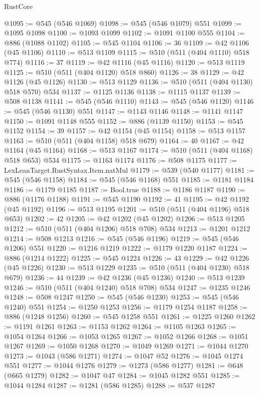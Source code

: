\begin{lexlean}{RustCore}
\begin{coremodule}
@1095 := @545 (@546 @1069)
@1098 := @545 (@546 @1079) @551
@1099 := @1095 @1098
@1100 := @1093 @1099
@1102 := @1091 @1100 @555
@1104 := @886 (@1088 @1102)
@1105 := @545 @1104
@1106 := 36
@1109 := @42 @1106 (@45 @1106)
@1110 := @513 @1109
@1115 := @510 (@511 (@404 @1110) @518 @774)
@1116 := 37
@1119 := @42 @1116 (@45 @1116)
@1120 := @513 @1119
@1125 := @510 (@511 (@404 @1120) @518 @860)
@1126 := 38
@1129 := @42 @1126 (@45 @1126)
@1130 := @513 @1129
@1136 := @510 (@511 (@404 @1130) @518 @570) @534
@1137 := @1125 @1136
@1138 := @1115 @1137
@1139 := @508 @1138
@1141 := @545 (@546 @1110)
@1143 := @545 (@546 @1120)
@1146 := @545 (@546 @1130) @551
@1147 := @1143 @1146
@1148 := @1141 @1147
@1150 := @1091 @1148 @555
@1152 := @886 (@1139 @1150)
@1153 := @545 @1152
@1154 := 39
@1157 := @42 @1154 (@45 @1154)
@1158 := @513 @1157
@1163 := @510 (@511 (@404 @1158) @518 @679)
@1164 := 40
@1167 := @42 @1164 (@45 @1164)
@1168 := @513 @1167
@1174 := @510 (@511 (@404 @1168) @518 @653) @534
@1175 := @1163 @1174
@1176 := @508 @1175
@1177 := LexLeanTarget.RustSyntax.Item.natMul
@1179 := @539 (@540 @1177)
@1181 := @545 (@546 @1158)
@1184 := @545 (@546 @1168) @551
@1185 := @1181 @1184
@1186 := @1179 @1185
@1187 := Bool.true
@1188 := @1186 @1187
@1190 := @886 (@1176 @1188)
@1191 := @545 @1190
@1192 := 41
@1195 := @42 @1192 (@45 @1192)
@1196 := @513 @1195
@1201 := @510 (@511 (@404 @1196) @518 @653)
@1202 := 42
@1205 := @42 @1202 (@45 @1202)
@1206 := @513 @1205
@1212 := @510 (@511 (@404 @1206) @518 @708) @534
@1213 := @1201 @1212
@1214 := @508 @1213
@1216 := @545 (@546 @1196)
@1219 := @545 (@546 @1206) @551
@1220 := @1216 @1219
@1222 := @1179 @1220 @1187
@1224 := @886 (@1214 @1222)
@1225 := @545 @1224
@1226 := 43
@1229 := @42 @1226 (@45 @1226)
@1230 := @513 @1229
@1235 := @510 (@511 (@404 @1230) @518 @679)
@1236 := 44
@1239 := @42 @1236 (@45 @1236)
@1240 := @513 @1239
@1246 := @510 (@511 (@404 @1240) @518 @708) @534
@1247 := @1235 @1246
@1248 := @508 @1247
@1250 := @545 (@546 @1230)
@1253 := @545 (@546 @1240) @551
@1254 := @1250 @1253
@1256 := @1179 @1254 @1187
@1258 := @886 (@1248 @1256)
@1260 := @545 @1258 @551
@1261 := @1225 @1260
@1262 := @1191 @1261
@1263 := @1153 @1262
@1264 := @1105 @1263
@1265 := @1054 @1264
@1266 := @1053 @1265
@1267 := @1052 @1266
@1268 := @1051 @1267
@1269 := @1050 @1268
@1270 := @1049 @1269
@1271 := @1044 @1270
@1273 := @1043 (@586 @1271)
@1274 := @1047 @52
@1276 := @1045 @1274 @551
@1277 := @1044 @1276
@1279 := @1273 (@586 @1277)
@1281 := @648 (@665 @1279)
@1282 := @1047 @47
@1284 := @1045 @1282 @551
@1285 := @1044 @1284
@1287 := @1281 (@586 @1285)
@1288 := @537 @1287

\end{coremodule}
\end{lexlean}
